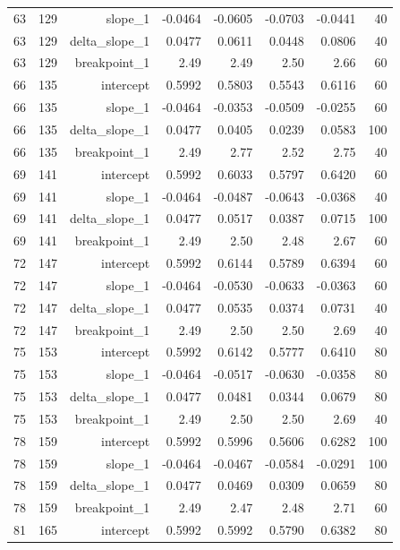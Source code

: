 {\begin{longtable}{lrrrrrrr}
  63 & 129 & slope\_1 & -0.0464 & -0.0605 & -0.0703 & -0.0441 & 40 \\
  63 & 129 & delta\_slope\_1 & 0.0477 & 0.0611 & 0.0448 & 0.0806 & 40 \\
  63 & 129 & breakpoint\_1 & 2.49 & 2.49 & 2.50 & 2.66 & 60 \\
  66 & 135 & intercept & 0.5992 & 0.5803 & 0.5543 & 0.6116 & 60 \\
  66 & 135 & slope\_1 & -0.0464 & -0.0353 & -0.0509 & -0.0255 & 60 \\
  66 & 135 & delta\_slope\_1 & 0.0477 & 0.0405 & 0.0239 & 0.0583 & 100 \\
  66 & 135 & breakpoint\_1 & 2.49 & 2.77 & 2.52 & 2.75 & 40 \\
  69 & 141 & intercept & 0.5992 & 0.6033 & 0.5797 & 0.6420 & 60 \\
  69 & 141 & slope\_1 & -0.0464 & -0.0487 & -0.0643 & -0.0368 & 40 \\
  69 & 141 & delta\_slope\_1 & 0.0477 & 0.0517 & 0.0387 & 0.0715 & 100 \\
  69 & 141 & breakpoint\_1 & 2.49 & 2.50 & 2.48 & 2.67 & 60 \\
  72 & 147 & intercept & 0.5992 & 0.6144 & 0.5789 & 0.6394 & 60 \\
  72 & 147 & slope\_1 & -0.0464 & -0.0530 & -0.0633 & -0.0363 & 60 \\
  72 & 147 & delta\_slope\_1 & 0.0477 & 0.0535 & 0.0374 & 0.0731 & 40 \\
  72 & 147 & breakpoint\_1 & 2.49 & 2.50 & 2.50 & 2.69 & 40 \\
  75 & 153 & intercept & 0.5992 & 0.6142 & 0.5777 & 0.6410 & 80 \\
  75 & 153 & slope\_1 & -0.0464 & -0.0517 & -0.0630 & -0.0358 & 80 \\
  75 & 153 & delta\_slope\_1 & 0.0477 & 0.0481 & 0.0344 & 0.0679 & 80 \\
  75 & 153 & breakpoint\_1 & 2.49 & 2.50 & 2.50 & 2.69 & 40 \\
  78 & 159 & intercept & 0.5992 & 0.5996 & 0.5606 & 0.6282 & 100 \\
  78 & 159 & slope\_1 & -0.0464 & -0.0467 & -0.0584 & -0.0291 & 100 \\
  78 & 159 & delta\_slope\_1 & 0.0477 & 0.0469 & 0.0309 & 0.0659 & 80 \\
  78 & 159 & breakpoint\_1 & 2.49 & 2.47 & 2.48 & 2.71 & 60 \\
  81 & 165 & intercept & 0.5992 & 0.5992 & 0.5790 & 0.6382 & 80 \\

\end{longtable}}
